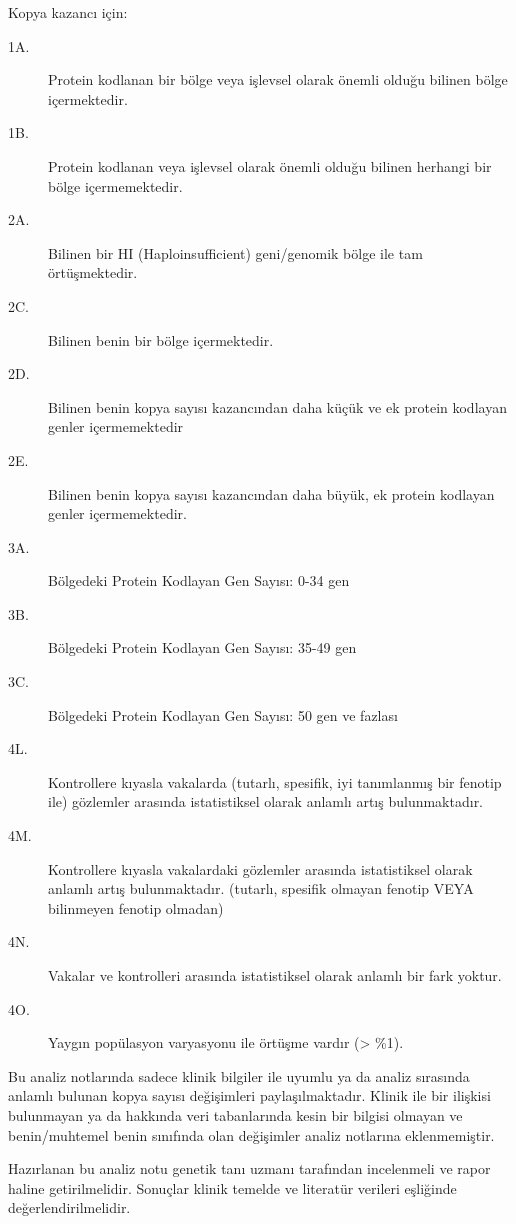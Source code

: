 \documentclass{article}
\begin{document}
Kopya kazancı için:
\begin{description}
\item[1A.] Protein kodlanan bir bölge veya işlevsel olarak önemli olduğu bilinen bölge içermektedir.
\item[1B.] Protein kodlanan veya işlevsel olarak önemli olduğu bilinen herhangi bir bölge içermemektedir.
\item[2A.] Bilinen bir HI (Haploinsufficient) geni/genomik bölge ile tam örtüşmektedir. 
\item[2C.] Bilinen benin bir bölge içermektedir.
\item[2D.] Bilinen benin kopya sayısı kazancından daha küçük ve ek protein kodlayan genler içermemektedir
\item[2E.] Bilinen benin kopya sayısı kazancından daha büyük, ek protein kodlayan genler içermemektedir.
\item[3A.] Bölgedeki Protein Kodlayan Gen Sayısı: 0-34 gen
\item[3B.] Bölgedeki Protein Kodlayan Gen Sayısı: 35-49 gen
\item[3C.] Bölgedeki Protein Kodlayan Gen Sayısı: 50 gen ve fazlası
\item[4L.] Kontrollere kıyasla vakalarda (tutarlı, spesifik, iyi tanımlanmış bir fenotip ile) gözlemler arasında istatistiksel olarak anlamlı artış bulunmaktadır.
\item[4M.] Kontrollere kıyasla vakalardaki gözlemler arasında istatistiksel olarak anlamlı artış bulunmaktadır. (tutarlı, spesifik olmayan fenotip VEYA bilinmeyen fenotip olmadan)
\item[4N.] Vakalar ve kontrolleri arasında istatistiksel olarak anlamlı bir fark yoktur.
\item[4O.] Yaygın popülasyon varyasyonu ile örtüşme vardır (> \%1). 
\end{description}

Bu analiz notlarında sadece klinik bilgiler ile uyumlu ya da analiz sırasında anlamlı bulunan kopya sayısı değişimleri paylaşılmaktadır. Klinik ile bir ilişkisi bulunmayan ya da hakkında veri tabanlarında kesin bir bilgisi olmayan ve benin/muhtemel benin sınıfında olan değişimler analiz notlarına eklenmemiştir.

Hazırlanan bu analiz notu genetik tanı uzmanı tarafından incelenmeli ve rapor haline getirilmelidir. Sonuçlar klinik temelde ve literatür verileri eşliğinde değerlendirilmelidir.
\end{document}
